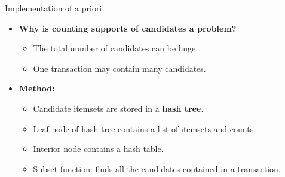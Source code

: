 \documentclass[aspectratio=169,t,xcolor=dvipsnames]{beamer}
\begin{document}
  {
    \begin{frame}{Implementation of a priori}
    \begin{itemize}
      \item \textbf{Why is counting supports of candidates a problem?}
      \begin{itemize}
        \item The total number of candidates can be huge.
        \item One transaction may contain many candidates.
      \end{itemize}
      \item \textbf{Method:}
      \begin{itemize}
        \item Candidate itemsets are stored in a \textbf{hash tree}.
        \item Leaf node of hash tree contains a list of itemsets and counts.
        \item Interior node contains a hash table.
        \item Subset function: finds all the candidates contained in a transaction.
      \end{itemize}
    \end{itemize}
    \end{frame}
  }
\end{document}

